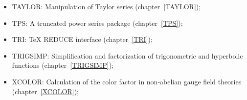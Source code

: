 \begin{itemize}
\item
{TAYLOR: Manipulation of Taylor series} (chapter~\ref{TAYLOR});

\item
{TPS: A truncated power series package} (chapter~\ref{TPS});

\item
{TRI: TeX REDUCE interface} (chapter~\ref{TRI});

\item
{TRIGSIMP: Simplification and factorization of trigonometric and
hyperbolic functions} (chapter~\ref{TRIGSIMP}); 

\item
{XCOLOR: Calculation of the color factor in non-abelian gauge field
theories} (chapter~\ref{XCOLOR}); 


\end{itemize}
